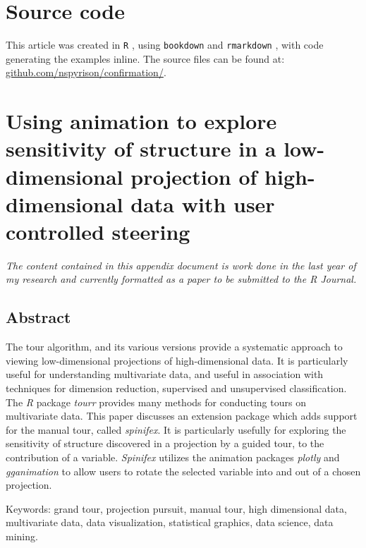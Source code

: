 \documentclass{monashthesis}
\begin{document}
\chapter*{Source code}\label{source-code}

This article was created in \texttt{R} \autocite{r_core_team_r:_2018},
using \texttt{bookdown} \autocite{xie_bookdown:_2016} and
\texttt{rmarkdown} \autocite{xie_r_2018}, with code generating the
examples inline. The source files can be found at:
\href{https://github.com/nspyrison/Confirmation}{github.com/nspyrison/confirmation/}.

\appendix

\chapter{Using animation to explore sensitivity of structure in a
low-dimensional projection of high-dimensional data with user controlled
steering}\label{ch:spinifex_paper}

\emph{The content contained in this appendix document is work done in
the last year of my research and currently formatted as a paper to be
submitted to the R Journal.}

\section{Abstract}\label{abstract-1}

The tour algorithm, and its various versions provide a systematic
approach to viewing low-dimensional projections of high-dimensional
data. It is particularly useful for understanding multivariate data, and
useful in association with techniques for dimension reduction,
supervised and unsupervised classification. The \emph{R} package
\emph{tourr} provides many methods for conducting tours on multivariate
data. This paper discusses an extension package which adds support for
the manual tour, called \emph{spinifex}. It is particularly usefully for
exploring the sensitivity of structure discovered in a projection by a
guided tour, to the contribution of a variable. \emph{Spinifex} utilizes
the animation packages \emph{plotly} and \emph{gganimation} to allow
users to rotate the selected variable into and out of a chosen
projection.

Keywords: grand tour, projection pursuit, manual tour, high dimensional
data, multivariate data, data visualization, statistical graphics, data
science, data mining.
\end{document}
